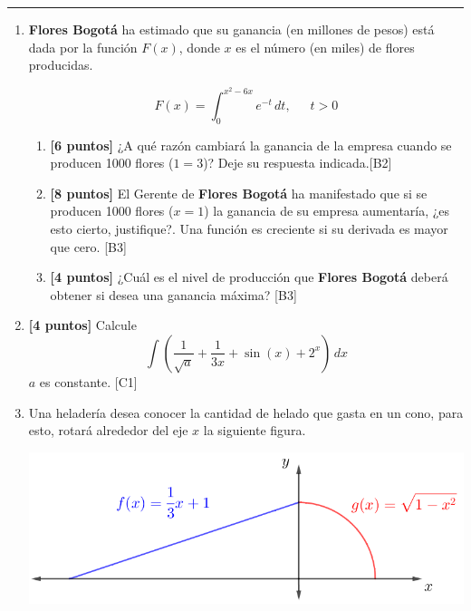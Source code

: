 \documentclass[10pt]{exam}
\begin{document}
\addpoints

\noindent
\rule[2ex]{\textwidth}{2pt}


\begin{enumerate}
\normalsize
\setlength{\columnsep}{10mm}

    \item  \textbf{Flores Bogotá}
ha estimado que su ganancia (en millones de pesos) está dada por la función $F(x)$, donde $x$ es el número  (en miles) de flores producidas.



$$F(x)=\int_0^{x^2-6x}e^{-t}\, dt,\,\,\,\,\,\,\,\,\,t>0$$
\begin{enumerate}

    \item \textbf{[6 puntos]} ¿A qué razón cambiará la ganancia de la empresa cuando se producen 1000 flores ($1=3$)?  Deje su respuesta indicada.\hfill{[B2]} 
    \item \textbf{[8 puntos]} El Gerente de \textbf{Flores Bogotá}  ha manifestado que si se producen 1000 flores ($x=1$) la ganancia de su empresa aumentaría, ¿es esto cierto,  justifique?.
    Una función es creciente si su derivada es mayor que cero. \hfill{[B3]} 
    \item \textbf{[4 puntos]} ¿Cuál es el nivel de producción que \textbf{Flores Bogotá} deberá obtener si desea una ganancia máxima?  \hfill{[B3]}
    \end{enumerate}




   \item \textbf{[4 puntos]} Calcule $$\int \left(\dfrac{1}{\sqrt{a}}+\dfrac{1}{3x}+\sin{(x)}+2^x \right)\, dx$$ 
$a$ es constante. \hfill{[C1]}
\item Una heladería desea conocer la cantidad de helado que gasta en un cono, para esto, rotará alrededor del eje $x$ la siguiente figura.

\begin{center}
    \includegraphics[scale=1.5]{cono.png}
\end{center}


\end{enumerate}
\end{document}

